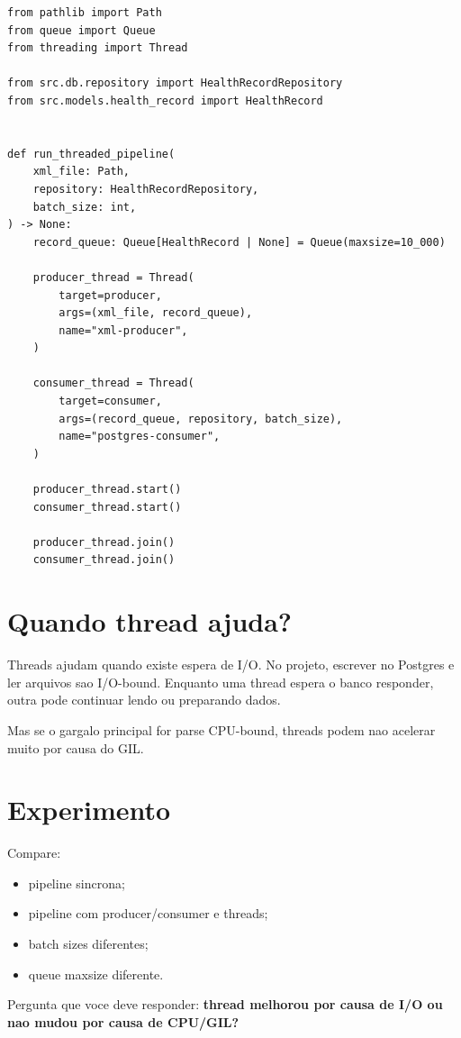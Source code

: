 \begin{lstlisting}[style=devbutterpython]
from pathlib import Path
from queue import Queue
from threading import Thread

from src.db.repository import HealthRecordRepository
from src.models.health_record import HealthRecord


def run_threaded_pipeline(
    xml_file: Path,
    repository: HealthRecordRepository,
    batch_size: int,
) -> None:
    record_queue: Queue[HealthRecord | None] = Queue(maxsize=10_000)

    producer_thread = Thread(
        target=producer,
        args=(xml_file, record_queue),
        name="xml-producer",
    )

    consumer_thread = Thread(
        target=consumer,
        args=(record_queue, repository, batch_size),
        name="postgres-consumer",
    )

    producer_thread.start()
    consumer_thread.start()

    producer_thread.join()
    consumer_thread.join()
\end{lstlisting}

\section{Quando thread ajuda?}

Threads ajudam quando existe espera de I/O. No projeto, escrever no Postgres e ler arquivos sao I/O-bound. Enquanto uma thread espera o banco responder, outra pode continuar lendo ou preparando dados.

Mas se o gargalo principal for parse CPU-bound, threads podem nao acelerar muito por causa do GIL.

\section{Experimento}

Compare:

\begin{itemize}
  \item pipeline sincrona;
  \item pipeline com producer/consumer e threads;
  \item batch sizes diferentes;
  \item queue maxsize diferente.
\end{itemize}

Pergunta que voce deve responder: \textbf{thread melhorou por causa de I/O ou nao mudou por causa de CPU/GIL?}
